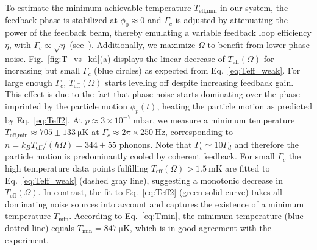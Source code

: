 \documentclass[reprint,aps,prl,superscriptaddress]{revtex4-2}
\begin{document}
To estimate the minimum achievable temperature $T_\text{eff,min}$ in our system, the feedback phase is stabilized at $\phi_0\approx0$ and $\Gamma_c$ is adjusted by attenuating the power of the feedback beam, thereby emulating a variable feedback loop efficiency $\eta$, with $\Gamma_c \propto \sqrt{\eta}$ (see~\cite{SM}). Additionally, we maximize $\Omega$ to benefit from lower phase noise. Fig.~\ref{fig:T_vs_kd}(a) displays the linear decrease of $T_\text{eff}(\Omega )$ for increasing but small $\Gamma_c$ (blue circles) as expected from Eq.~\ref{eq:Teff_weak}. For large enough $\Gamma_c$, $T_\text{eff}(\Omega )$  starts leveling off despite increasing feedback gain. This effect is due to the fact that phase noise starts dominating over the phase imprinted by the particle motion $\phi_p(t)$, heating the particle motion as predicted by Eq.~\ref{eq:Teff2}. At $p\approx 3\times 10^{-7}\SI{}{\milli\bar}$, we measure a minimum temperature  $T_\text{eff,min}\approx 705 \pm \SI{133}{\micro\kelvin}$ at $\Gamma_c \approx 2\pi\times \SI{250}{\hertz}$, corresponding to $n = k_B T_\text{eff} /(\hbar\Omega) =344 \pm 55$ phonons. Note that $\Gamma_c\simeq 10 \Gamma_d$ and  therefore the particle motion is predominantly cooled by coherent feedback. For small $\Gamma_c$ the high temperature data points fulfilling $T_\text{eff}(\Omega )>\SI{1.5}{\milli\K}$ are fitted to Eq.~\ref{eq:Teff_weak} (dashed gray line), suggesting a monotonic decrease in $T_\text{eff}(\Omega )$. In contrast, the fit to  Eq.~\ref{eq:Teff2} (green solid curve) takes all dominating noise sources into account and captures the existence of a minimum temperature $T_\text{min}$. According to Eq.~\ref{eq:Tmin}, the minimum temperature (blue dotted line) equals $T_\text{min} = \SI{847}{\micro\kelvin}$, which is in good agreement with the experiment. 
\end{document}
